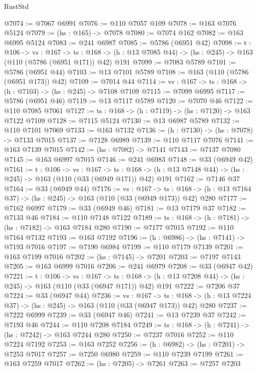 \begin{lexlean}{RustStd}
\begin{coremodule}
@7074 := @7067 @6991
@7076 := @110 @7057 @109
@7078 := @163 @7076 @5124
@7079 := (hs : @165) -> @7078
@7080 := @7074 @162
@7082 := @163 @6995 @5124
@7083 := @241 @6987
@7085 := @5786 (@6951 @42)
@7098 := {t : @106} ->
  {vs : @167} ->
  {ts : @168} -> (h : @13 @7085 @44) -> (hs : @245) -> @163 (@110 (@5786 (@6951 @171)) @42) @191
@7099 := @7083 @5789
@7101 := @5786 (@6951 @44)
@7103 := @13 @7101 @5789
@7108 := @163 (@110 (@5786 (@6951 @173)) @42)
@7109 := @7014 @44
@7114 := {vs : @167} -> {ts : @168} -> (h : @7103) -> (hs : @245) -> @7108 @7109
@7115 := @7099 @6995
@7117 := @5786 (@6951 @46)
@7119 := @13 @7117 @5789
@7120 := @7070 @46
@7122 := @110 @7085 @7061
@7127 := {ts : @168} -> (h : @7119) -> (hs : @7120) -> @163 @7122 @7109
@7128 := @7115 @5124
@7130 := @13 @6987 @5789
@7132 := @110 @7101 @7069
@7133 := @163 @7132
@7136 := (h : @7130) -> (hs : @7078) -> @7133 @7015
@7137 := @7128 @6989
@7139 := @110 @7117 @7076
@7141 := @163 @7139 @7015
@7142 := (hs : @7082) -> @7141
@7143 := @7137 @7080
@7145 := @163 @6997 @7015
@7146 := @241 @6983
@7148 := @33 (@6949 @42)
@7161 := {t : @106} ->
  {vs : @167} ->
  {ts : @168} -> (h : @13 @7148 @44) -> (hs : @245) -> @163 (@110 (@33 (@6949 @171)) @42) @191
@7162 := @7146 @37
@7164 := @33 (@6949 @44)
@7176 := {vs : @167} ->
  {ts : @168} -> (h : @13 @7164 @37) -> (hs : @245) -> @163 (@110 (@33 (@6949 @173)) @42) @280
@7177 := @7162 @6997
@7179 := @33 (@6949 @46)
@7181 := @13 @7179 @37
@7182 := @7133 @46
@7184 := @110 @7148 @7122
@7189 := {ts : @168} -> (h : @7181) -> (hs : @7182) -> @163 @7184 @280
@7190 := @7177 @7015
@7192 := @110 @7164 @7132
@7193 := @163 @7192
@7196 := (h : @6986) -> (hs : @7141) -> @7193 @7016
@7197 := @7190 @6984
@7199 := @110 @7179 @7139
@7201 := @163 @7199 @7016
@7202 := (hs : @7145) -> @7201
@7203 := @7197 @7143
@7205 := @163 @6999 @7016
@7206 := @241 @6979
@7208 := @33 (@6947 @42)
@7221 := {t : @106} ->
  {vs : @167} ->
  {ts : @168} -> (h : @13 @7208 @44) -> (hs : @245) -> @163 (@110 (@33 (@6947 @171)) @42) @191
@7222 := @7206 @37
@7224 := @33 (@6947 @44)
@7236 := {vs : @167} ->
  {ts : @168} -> (h : @13 @7224 @37) -> (hs : @245) -> @163 (@110 (@33 (@6947 @173)) @42) @280
@7237 := @7222 @6999
@7239 := @33 (@6947 @46)
@7241 := @13 @7239 @37
@7242 := @7193 @46
@7244 := @110 @7208 @7184
@7249 := {ts : @168} -> (h : @7241) -> (hs : @7242) -> @163 @7244 @280
@7250 := @7237 @7016
@7252 := @110 @7224 @7192
@7253 := @163 @7252
@7256 := (h : @6982) -> (hs : @7201) -> @7253 @7017
@7257 := @7250 @6980
@7259 := @110 @7239 @7199
@7261 := @163 @7259 @7017
@7262 := (hs : @7205) -> @7261
@7263 := @7257 @7203

\end{coremodule}
\end{lexlean}
